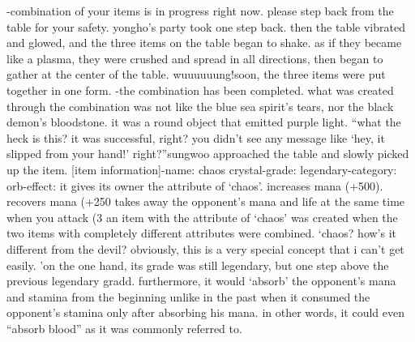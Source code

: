 -combination of your items is in progress right now.
 please step back from the table for your safety.
yongho’s party took one step back.
 then the table vibrated and glowed, and the three items on the table began to shake.
 as if they became like a plasma, they were crushed and spread in all directions, then began to gather at the center of the table.
wuuuuuung!soon, the three items were put together in one form.
-the combination has been completed.
what was created through the combination was not like the blue sea spirit’s tears, nor the black demon’s bloodstone.
 it was a round object that emitted purple light.
“what the heck is this? it was successful, right? you didn’t see any message like ‘hey, it slipped from your hand!’ right?”sungwoo approached the table and slowly picked up the item.
[item information]-name: chaos crystal-grade: legendary-category: orb-effect: it gives its owner the attribute of ‘chaos’.
 increases mana (+500).
 recovers mana (+250%
 takes away the opponent’s mana and life at the same time when you attack (3%
an item with the attribute of ‘chaos’ was created when the two items with completely different attributes were combined.
‘chaos? how’s it different from the devil? obviously, this is a very special concept that i can’t get easily.
’on the one hand, its grade was still legendary, but one step above the previous legendary gradd.
furthermore, it would ‘absorb’ the opponent’s mana and stamina from the beginning unlike in the past when it consumed the opponent’s stamina only after absorbing his mana.
in other words, it could even “absorb blood” as it was commonly referred to.

